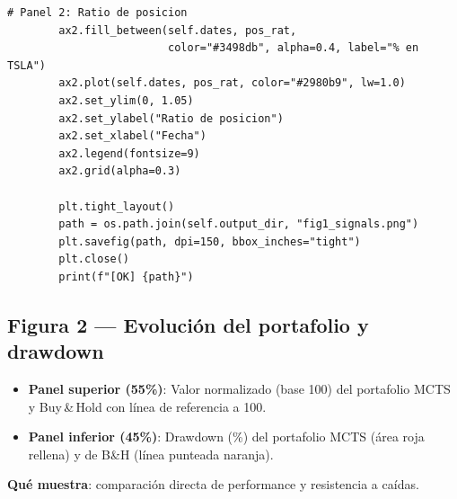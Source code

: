 \documentclass[12pt, a4paper]{article}
\begin{document}
\begin{lstlisting}[caption={Figura 1 -- senales y ratio de posicion}]
        # Panel 2: Ratio de posicion
        ax2.fill_between(self.dates, pos_rat,
                         color="#3498db", alpha=0.4, label="% en TSLA")
        ax2.plot(self.dates, pos_rat, color="#2980b9", lw=1.0)
        ax2.set_ylim(0, 1.05)
        ax2.set_ylabel("Ratio de posicion")
        ax2.set_xlabel("Fecha")
        ax2.legend(fontsize=9)
        ax2.grid(alpha=0.3)

        plt.tight_layout()
        path = os.path.join(self.output_dir, "fig1_signals.png")
        plt.savefig(path, dpi=150, bbox_inches="tight")
        plt.close()
        print(f"[OK] {path}")
\end{lstlisting}

\subsection{Figura 2 --- Evolución del portafolio y drawdown}

\begin{tcolorbox}[figura, title={Fig.\ 2: \texttt{fig2\_performance.png}}]
\begin{itemize}\small
  \item \textbf{Panel superior (55\%)}: Valor normalizado (base 100) del
        portafolio MCTS y Buy\,\&\,Hold con línea de referencia a 100.
  \item \textbf{Panel inferior (45\%)}: Drawdown (\%) del portafolio MCTS
        (área roja rellena) y de B\&H (línea punteada naranja).
\end{itemize}
\textbf{Qué muestra}: comparación directa de performance y resistencia a caídas.
\end{tcolorbox}
\end{document}
